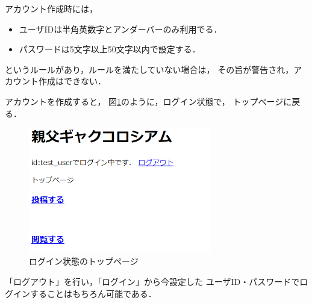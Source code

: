 \documentclass[a4paper,dvipdfmx,11pt]{jsreport}
\begin{document}
アカウント作成時には，
\begin{itemize}
  \item ユーザIDは半角英数字とアンダーバーのみ利用でる．
  \item パスワードは5文字以上50文字以内で設定する．
\end{itemize}
というルールがあり，ルールを満たしていない場合は，
その旨が警告され，アカウント作成はできない．

アカウントを作成すると，
図\ref{fig:top_auth}のように，ログイン状態で，
トップページに戻る．
\begin{figure}[tb]
  \centering
  \includegraphics[width=8cm]{img/top_auth.png}
  \caption{ログイン状態のトップページ\label{fig:top_auth}}
\end{figure}

「ログアウト」を行い，「ログイン」から今設定した
ユーザID・パスワードでログインすることはもちろん可能である．
\end{document}
